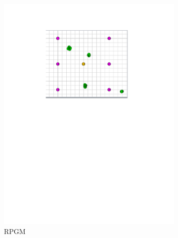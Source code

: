 \documentclass[conference]{IEEEtran}
\begin{document}
\begin{figure}
    \centering
    \begin{subfigure}[b]{0.22\textwidth}
        \includegraphics[trim= 140 420 140 50, clip, width=\textwidth]{Nomadic_Model.pdf}
        \caption{RPGM}
        \label{fig:rpgm}
    \end{subfigure}
    ~ %
    \begin{subfigure}[b]{0.22\textwidth}

\end{subfigure}
\end{figure}
\end{document}
